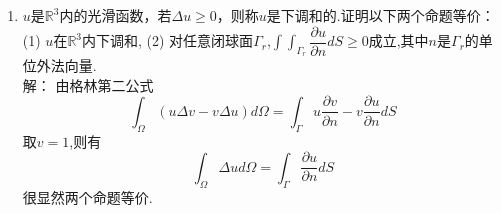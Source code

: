 \documentclass[11pt]{article}
\begin{document}
\begin{enumerate}
     \item $u$是$\mathbb{R}^3$内的光滑函数，若$\Delta u \geq 0$，则称$u$是下调和的.证明以下两个命题等价：
       \subitem(1) $u$在$\mathbb{R}^3$内下调和,
       \subitem(2) 对任意闭球面$\Gamma_r$,$\displaystyle\int\int_{\Gamma_r}\dfrac{\partial u}{\partial n}dS\geq 0$成立,其中$n$是$\Gamma_r$的单位外法向量.\\
        解：
        由格林第二公式\[\displaystyle\int_{\Omega}(u\Delta v-v\Delta u)d\Omega=\displaystyle\int_{\Gamma}u\dfrac{\partial v}{\partial n}-v\dfrac{\partial u}{\partial n}dS\]
        取$v=1$,则有\[\displaystyle\int_{\Omega}\Delta ud\Omega=\displaystyle\int_{\Gamma}\dfrac{\partial u}{\partial n}dS\]
        很显然两个命题等价.
    \end{enumerate}
\end{document}
